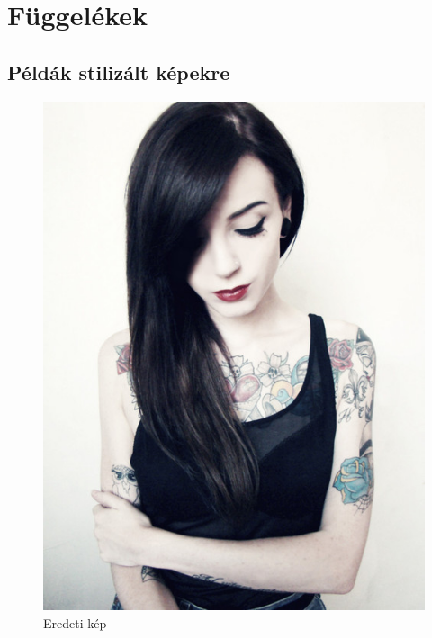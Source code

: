 \documentclass[12pt, a4paper, oneside]{book}
\theoremstyle{tetel}
\begin{document}
\newpage
\appendix
\chapter*{Függelékek}
\begin{subappendices}
	\section*{Példák stilizált képekre}
		\begin{figure}[!htbp]
			\begin{center}
				\includegraphics[scale=0.3]{stylistic/original/girl.jpg}
				\caption[]{Eredeti kép}
				\label{original_girl}
			\end{center}
		\end{figure} 
		

\end{subappendices}
\end{document}
